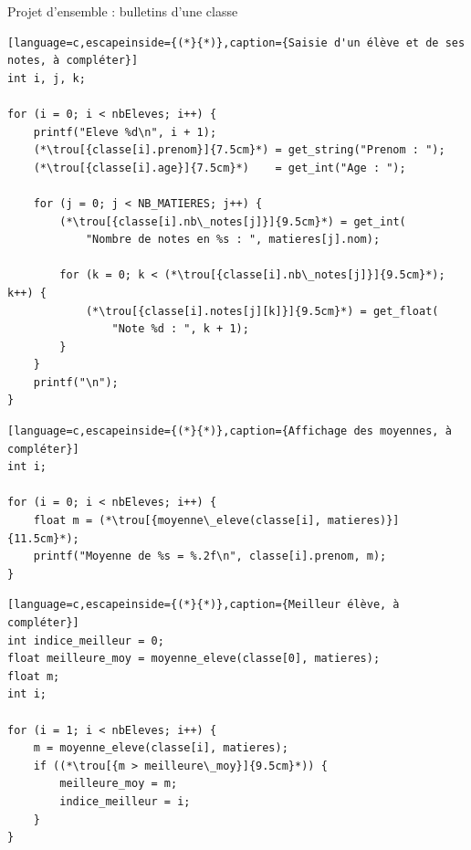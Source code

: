 \begin{UPSTIexercice}{Projet d'ensemble : bulletins d'une classe}
\begin{lstlisting}[language=c,escapeinside={(*}{*)},caption={Saisie d'un élève et de ses notes, à compléter}]
int i, j, k;

for (i = 0; i < nbEleves; i++) {
    printf("Eleve %d\n", i + 1);
    (*\trou[{classe[i].prenom}]{7.5cm}*) = get_string("Prenom : ");
    (*\trou[{classe[i].age}]{7.5cm}*)    = get_int("Age : ");

    for (j = 0; j < NB_MATIERES; j++) {
        (*\trou[{classe[i].nb\_notes[j]}]{9.5cm}*) = get_int(
            "Nombre de notes en %s : ", matieres[j].nom);

        for (k = 0; k < (*\trou[{classe[i].nb\_notes[j]}]{9.5cm}*); k++) {
            (*\trou[{classe[i].notes[j][k]}]{9.5cm}*) = get_float(
                "Note %d : ", k + 1);
        }
    }
    printf("\n");
}
\end{lstlisting}



\begin{lstlisting}[language=c,escapeinside={(*}{*)},caption={Affichage des moyennes, à compléter}]
int i;

for (i = 0; i < nbEleves; i++) {
    float m = (*\trou[{moyenne\_eleve(classe[i], matieres)}]{11.5cm}*);
    printf("Moyenne de %s = %.2f\n", classe[i].prenom, m);
}
\end{lstlisting}



\begin{lstlisting}[language=c,escapeinside={(*}{*)},caption={Meilleur élève, à compléter}]
int indice_meilleur = 0;
float meilleure_moy = moyenne_eleve(classe[0], matieres);
float m;
int i;

for (i = 1; i < nbEleves; i++) {
    m = moyenne_eleve(classe[i], matieres);
    if ((*\trou[{m > meilleure\_moy}]{9.5cm}*)) {
        meilleure_moy = m;
        indice_meilleur = i;
    }
}


\end{lstlisting}
\end{UPSTIexercice}
